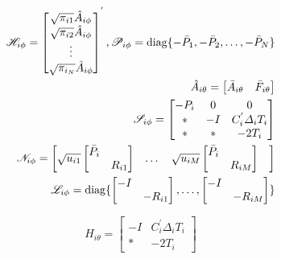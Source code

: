 \documentclass[conference]{IEEEtran}
\begin{document}
\begin{equation}\notag
	\begin{aligned}
		\mathscr{H}_{i\phi}=\begin{bmatrix}
			\sqrt{\pi_{i1}}\hat{A}_{i\phi}\\
			\sqrt{\pi_{i2}}\hat{A}_{i\phi}\\
			\vdots\\
			\sqrt{\pi_{i_N}}\hat{A}_{i\phi}
		\end{bmatrix}^{'},
		\mathscr{P}_{i\phi}=\mathrm{diag} \{-\bar{P}_{1},-\bar{P}_{2},\dots,-\bar{P}_{N}  \}\\
		\hat{A}_{i\theta}=\begin{bmatrix}
			\bar{A}_{i\theta}&\bar{F}_{i\theta}
		\end{bmatrix}  \\
		\mathscr{S}_{i\phi} = \begin{bmatrix}
			-P_{i}&0&0\\
			*&-I&C^{'}_{i}\varDelta_{i}T_{i}\\
			*&*&-2T_{i}
		\end{bmatrix}\\
		\mathscr{N}_{i\phi}=\begin{bmatrix}
				\sqrt{u_{i1}}\begin{bmatrix}
				\bar{P}_{i}&\\
				&R_{i1}
			\end{bmatrix}&
			\dots&	
			\sqrt{u_{iM}}\begin{bmatrix}
				\bar{P}_{i}&\\
				&R_{iM}
			\end{bmatrix}&
		\end{bmatrix} \\
		\mathscr{L}_{i\phi}=\mathrm{diag}\{\begin{bmatrix}
			-I&\\
			&-R_{i1}
		\end{bmatrix},\dots,
		\begin{bmatrix}
			-I&\\
			&-R_{iM}
		\end{bmatrix}  \}
	\end{aligned}
\end{equation}



\begin{equation*}
H_{i\theta}=\begin{bmatrix}
-I&C^{'}_{i}\varDelta_{i}T_{i} \\
*&-2T_{i}
\end{bmatrix}
\end{equation*}
\end{document}
